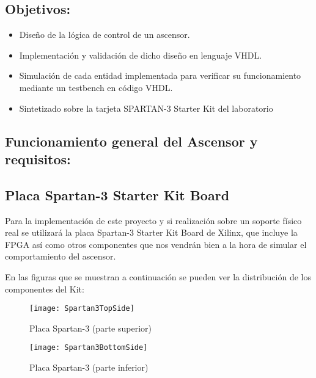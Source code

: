 

\subsection{Objetivos:}
    \begin{itemize}
        \item Diseño de la lógica de control de un ascensor.
        \item Implementación y validación de dicho diseño en lenguaje VHDL.
        \item Simulación de cada entidad implementada para verificar su funcionamiento mediante un testbench en código VHDL.
        \item Sintetizado sobre la tarjeta SPARTAN-3 Starter Kit del laboratorio
    \end{itemize}
    
\subsection{Funcionamiento general del Ascensor y requisitos:}

\subsection{Placa Spartan-3 Starter Kit Board} \label{subsection:Spartan-3}
    
    Para la implementación de este proyecto y si realización sobre un soporte físico real se utilizará la placa Spartan-3 Starter Kit Board de Xilinx, que incluye la FPGA así como otros componentes que nos vendrán bien a la hora de simular el comportamiento del ascensor.

    En las figuras que se muestran a continuación se pueden ver la distribución de los componentes del Kit:

    \begin{figure}[H]
            \centering
            \texttt{[image: Spartan3TopSide]}
            \caption{Placa Spartan-3 (parte superior)}
            \label{fig:Spartan3TopSide}
    \end{figure}

    \begin{figure}[H]
            \centering
            \texttt{[image: Spartan3BottomSide]}
            \caption{Placa Spartan-3 (parte inferior)}
            \label{fig:Spartan3BottomSide}
    \end{figure}

